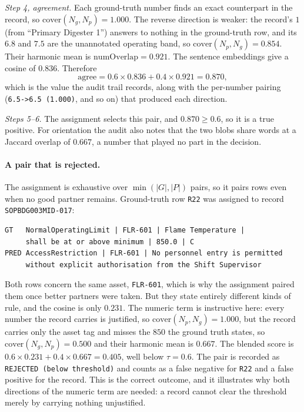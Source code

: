 \documentclass[11pt]{article}
\begin{document}
\emph{Step 4, agreement.} Each ground-truth number finds an exact counterpart in
the record, so $\mathrm{cover}(N_g,N_p) = 1.000$. The reverse direction is
weaker: the record's $1$ (from ``Primary Digester 1'') answers to nothing in the
ground-truth row, and its $6.8$ and $7.5$ are the unannotated operating band, so
$\mathrm{cover}(N_p,N_g) = 0.854$. Their harmonic mean is
$\mathrm{numOverlap} = 0.921$. The sentence embeddings give a cosine of $0.836$.
Therefore
\[
\mathrm{agree} = 0.6 \times 0.836 + 0.4 \times 0.921 = 0.870,
\]
which is the value the audit trail records, along with the per-number pairing
(\texttt{6.5->6.5 (1.000)}, and so on) that produced each direction.

\emph{Steps 5--6.} The assignment selects this pair, and $0.870 \ge 0.6$, so it
is a true positive. For orientation the audit also notes that the two blobs share
words at a Jaccard overlap of $0.667$, a number that played no part in the
decision.

\paragraph{A pair that is rejected.} The assignment is exhaustive over
$\min(|G|,|P|)$ pairs, so it pairs rows even when no good partner remains.
Ground-truth row \texttt{R22} was assigned to record
\texttt{SOPBDG003MID-017}:

\begin{lstlisting}
GT   NormalOperatingLimit | FLR-601 | Flame Temperature |
     shall be at or above minimum | 850.0 | C
PRED AccessRestriction | FLR-601 | No personnel entry is permitted
     without explicit authorisation from the Shift Supervisor
\end{lstlisting}

Both rows concern the same asset, \texttt{FLR-601}, which is why the assignment
paired them once better partners were taken. But they state entirely different
kinds of rule, and the cosine is only $0.231$. The numeric term is instructive
here: every number the record carries is justified, so
$\mathrm{cover}(N_p,N_g) = 1.000$, but the record carries only the asset tag and
misses the $850$ the ground truth states, so $\mathrm{cover}(N_g,N_p) = 0.500$
and their harmonic mean is $0.667$. The blended score is
$0.6 \times 0.231 + 0.4 \times 0.667 = 0.405$, well below $\tau = 0.6$. The pair
is recorded as \texttt{REJECTED (below threshold)} and counts as a false negative
for \texttt{R22} and a false positive for the record. This is the correct
outcome, and it illustrates why both directions of the numeric term are needed:
a record cannot clear the threshold merely by carrying nothing unjustified.
\end{document}

